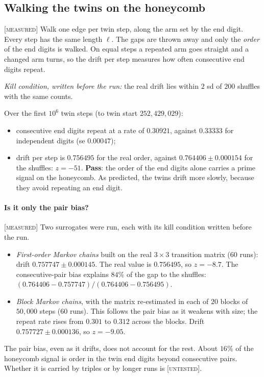 \documentclass[11pt]{article}
\theoremstyle{definition}
\theoremstyle{remark}
\newcommand{\grade}[1]{\textsc{[#1]}}
\begin{document}
\subsection{Walking the twins on the honeycomb} \grade{measured}
Walk one edge per twin step, along the arm set by the end digit. Every step has the same length $\ell$. The gaps are thrown away and only the \emph{order} of the end digits is walked. On equal steps a repeated arm goes straight and a changed arm turns, so the drift per step measures how often consecutive end digits repeat.

\emph{Kill condition, written before the run:} the real drift lies within $2$ sd of $200$ shuffles with the same counts.

\noindent Over the first $10^6$ twin steps (to twin start $252{,}429{,}029$):
\begin{itemize}
\item consecutive end digits repeat at a rate of $0.30921$, against $0.33333$ for independent digits (se $0.00047$);
\item drift per step is $0.756495$ for the real order, against $0.764406\pm0.000154$ for the shuffles: $z=-51$. \textbf{Pass}: the order of the end digits alone carries a prime signal on the honeycomb. As predicted, the twins drift more slowly, because they avoid repeating an end digit.
\end{itemize}

\paragraph{Is it only the pair bias?} \grade{measured}
Two surrogates were run, each with its kill condition written before the run.
\begin{itemize}
\item \emph{First-order Markov chains} built on the real $3\times3$ transition matrix (60 runs): drift $0.757747\pm0.000145$. The real value is $0.756495$, so $z=-8.7$. The consecutive-pair bias explains $84\%$ of the gap to the shuffles: $(0.764406-0.757747)/(0.764406-0.756495)$.
\item \emph{Block Markov chains}, with the matrix re-estimated in each of $20$ blocks of $50{,}000$ steps (60 runs). This follows the pair bias as it weakens with size; the repeat rate rises from $0.301$ to $0.312$ across the blocks. Drift $0.757727\pm0.000136$, so $z=-9.05$.
\end{itemize}
The pair bias, even as it drifts, does not account for the rest. About $16\%$ of the honeycomb signal is order in the twin end digits beyond consecutive pairs. Whether it is carried by triples or by longer runs is \grade{untested}.
\end{document}
